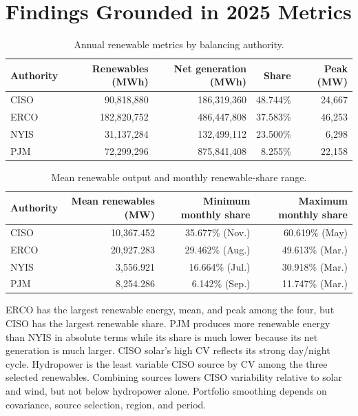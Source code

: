 \documentclass[11pt]{article}
\begin{document}
\section{Findings Grounded in 2025 Metrics}
\begin{table}[H]
\centering
\caption{Annual renewable metrics by balancing authority.}
\label{tab:annual}
\small
\begin{tabular}{lrrrr}
\toprule
Authority & Renewables (MWh) & Net generation (MWh) & Share & Peak (MW) \\
\midrule
CISO & 90,818,880 & 186,319,360 & 48.744\% & 24,667 \\
ERCO & 182,820,752 & 486,447,808 & 37.583\% & 46,253 \\
NYIS & 31,137,284 & 132,499,112 & 23.500\% & 6,298 \\
PJM  & 72,299,296 & 875,841,408 & 8.255\% & 22,158 \\
\bottomrule
\end{tabular}
\end{table}

\begin{table}[H]
\centering
\caption{Mean renewable output and monthly renewable-share range.}
\label{tab:means}
\small
\begin{tabular}{lrrr}
\toprule
Authority & Mean renewables (MW) & Minimum monthly share & Maximum monthly share \\
\midrule
CISO & 10,367.452 & 35.677\% (Nov.) & 60.619\% (May) \\
ERCO & 20,927.283 & 29.462\% (Aug.) & 49.613\% (Mar.) \\
NYIS & 3,556.921 & 16.664\% (Jul.) & 30.918\% (Mar.) \\
PJM  & 8,254.286 & 6.142\% (Sep.) & 11.747\% (Mar.) \\
\bottomrule
\end{tabular}
\end{table}

ERCO has the largest renewable energy, mean, and peak among the four, but CISO has the largest renewable share. PJM produces more renewable energy than NYIS in absolute terms while its share is much lower because its net generation is much larger. CISO solar's high CV reflects its strong day/night cycle. Hydropower is the least variable CISO source by CV among the three selected renewables. Combining sources lowers CISO variability relative to solar and wind, but not below hydropower alone. Portfolio smoothing depends on covariance, source selection, region, and period.
\end{document}

